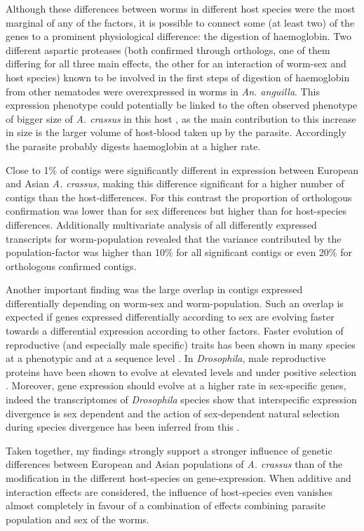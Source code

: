 Although these differences between worms in different host species
were the most marginal of any of the factors, it is possible to
connect some (at least two) of the genes to a prominent physiological
difference: the digestion of haemoglobin. Two different aspartic
proteases (both confirmed through orthologs, one of them differing for
all three main effects, the other for an interaction of worm-sex and
host species) known to be involved in the first steps of digestion of
haemoglobin from other nematodes \cite{pmid12782060} were
overexpressed in worms in \textit{An. anguilla}. This expression
phenotype could potentially be linked to the often observed phenotype
of bigger size of \textit{A. crassus} in this host
\cite{knopf_swimbladder_2006}, as the main contribution to this
increase in size is the larger volume of host-blood taken up by the
parasite. Accordingly the parasite probably digests haemoglobin at a
higher rate.

Close to 1\% of contigs were significantly different in expression
between European and Asian \textit{A. crassus}, making this difference
significant for a higher number of contigs than the
host-differences. For this contrast the proportion of orthologous
confirmation was lower than for sex differences but higher than for
host-species differences. Additionally multivariate analysis of all
differently expressed transcripts for worm-population revealed that
the variance contributed by the population-factor was higher than 10\%
for all significant contigs or even 20\% for orthologous confirmed
contigs.

Another important finding was the large overlap in contigs expressed
differentially depending on worm-sex and worm-population. Such an
overlap is expected if genes expressed differentially according to sex
are evolving faster towards a differential expression according to
other factors. Faster evolution of reproductive (and especially male
specific) traits has been shown in many species at a phenotypic and at
a sequence level \cite{pmid15795858}. In \textit{Drosophila}, male
reproductive proteins have been shown to evolve at elevated levels and
under positive selection \cite{pmid11404480}. Moreover, gene
expression should evolve at a higher rate in sex-specific genes,
indeed the transcriptomes of \textit{Drosophila} species show that
interspecific expression divergence is sex dependent and the action of
sex-dependent natural selection during species divergence has been
inferred from this \cite{pmid15034135,pmid19720861}.

Taken together, my findings strongly support a stronger influence of
genetic differences between European and Asian populations of
\textit{A. crassus} than of the modification in the different
host-species on gene-expression. When additive and interaction effects
are considered, the influence of host-species even vanishes almost
completely in favour of a combination of effects combining parasite
population and sex of the worms.


